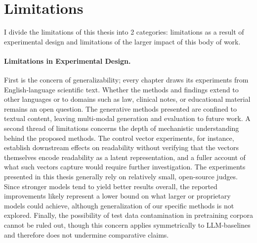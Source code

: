 \section{Limitations}\label{sec:thesis-limitations}

I divide the limitations of this thesis into 2 categories: limitations as a result of experimental design and limitations of the larger impact of this body of work.

\paragraph{Limitations in Experimental Design.} First is the concern of generalizability; every chapter draws its experiments from English-language scientific text. Whether the methods and findings extend to other languages or to domains such as law, clinical notes, or educational material remains an open question. The generative methods presented are confined to textual content, leaving multi-modal generation and evaluation to future work. A second thread of limitations concerns the depth of mechanistic understanding behind the proposed methods. The control vector experiments, for instance, establish downstream effects on readability without verifying that the vectors themselves encode readability as a latent representation, and a fuller account of what such vectors capture would require further investigation. The experiments presented in this thesis generally rely on relatively small, open-source judges. Since stronger models tend to yield better results overall, the reported improvements likely represent a lower bound on what larger or proprietary models could achieve, although generalization of our specific methods is not explored. Finally, the possibility of test data contamination in pretraining corpora cannot be ruled out, though this concern applies symmetrically to LLM-baselines and therefore does not undermine comparative claims.

